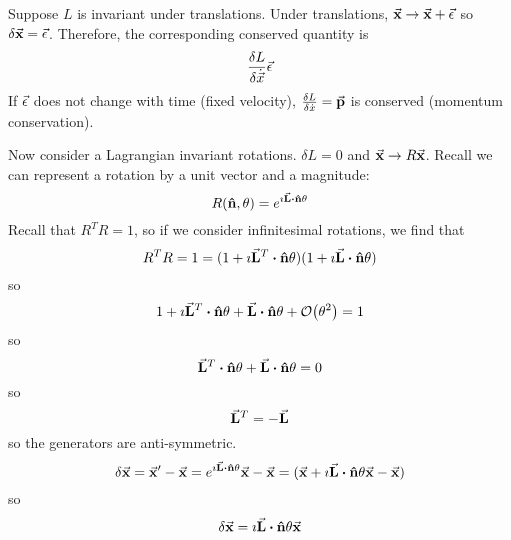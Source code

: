 \documentclass[a4paper,twoside,master.tex]{subfiles}
\begin{document}
\begin{ex}
    Suppose $ L $ is invariant under translations. Under translations, $\va{ x} \to\va{ x} + \va{\epsilon} $ so $ \delta\va{ x} = \va{\epsilon} $. Therefore, the corresponding conserved quantity is
    \begin{equation}
        \fdv{L}{\dot{\vec{x}}} \va{\epsilon}
    \end{equation}
    If $ \va{\epsilon} $ does not change with time (fixed velocity), $ \fdv{L}{\dot{x}} =\va{ p} $ is conserved (momentum conservation).
\end{ex}

\begin{ex}
    Now consider a Lagrangian invariant rotations. $ \delta L = 0 $ and $\va{ x} \to R\va{ x} $. Recall we can represent a rotation by a unit vector and a magnitude:
    \begin{equation}
        R(\vu{ n}, \theta) = e^{\imath\va{ L} \vdot\vu{ n} \theta}
    \end{equation}
    Recall that $ R^T R = 1 $, so if we consider infinitesimal rotations, we find that
    \begin{equation}
        R^TR = 1 = (1+ \imath\va{ L}^T \vdot\vu{ n} \theta)(1 + \imath\va{ L} \vdot\vu{ n} \theta)
    \end{equation}
    so
    \begin{equation}
        1 + \imath\va{ L}^T \vdot\vu{ n} \theta +\va{ L} \vdot\vu{ n} \theta + \order{\theta^2} = 1
    \end{equation}
    so
    \begin{equation}
        \va{ L}^T \vdot\vu{ n} \theta +\va{ L} \vdot\vu{ n} \theta = 0
    \end{equation}
    so
    \begin{equation}
        \va{ L}^T = -\va{ L}
    \end{equation}
    so the generators are anti-symmetric.
    \begin{equation}
        \delta\va{ x} =\va{ x}' -\va{ x} = e^{\imath\va{ L} \vdot\vu{ n} \theta}\va{ x} -\va{ x} = (\va{x} + \imath\va{ L} \vdot\vu{ n} \theta\va{ x} -\va{ x})
    \end{equation}
    so
    \begin{equation}
        \delta\va{ x} = \imath\va{ L} \vdot\vu{ n} \theta\va{ x}
    \end{equation}


\end{ex}
\end{document}
